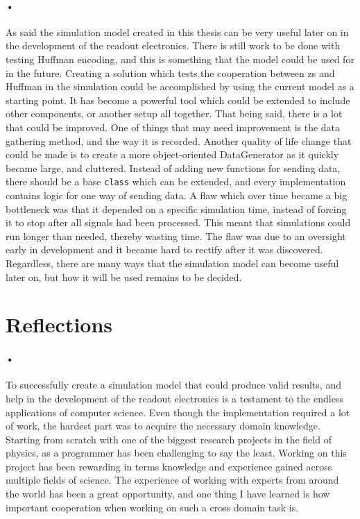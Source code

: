 \documentclass[a4paper, 12pt]{report}
\newcommand{\codeword}[1]{\texttt{#1}}
\begin{document}
\paragraph{•}
As said the simulation model created in this thesis can be very useful later on in the development of the readout electronics.
There is still work to be done with testing Huffman encoding, and this is something that the model could be used for in the future.
Creating a solution which tests the cooperation between \gls{zs} and Huffman in the simulation could be accomplished by using the current model as a starting point.
It has become a powerful tool which could be extended to include other components, or another setup all together.
That being said, there is a lot that could be improved.
One of things that may need improvement is the data gathering method, and the way it is recorded.
Another quality of life change that could be made is to create a more object-oriented DataGenerator as it quickly became large, and cluttered.
Instead of adding new functions for sending data, there should be a base \codeword{class} which can be extended, and every implementation contains logic for one way of sending data.
A flaw which over time became a big bottleneck was that it depended on a specific simulation time, instead of forcing it to stop after all signals had been processed.
This meant that simulations could run longer than needed, thereby wasting time.
The flaw was due to an oversight early in development and it became hard to rectify after it was discovered.
Regardless, there are many ways that the simulation model can become useful later on, but how it will be used remains to be decided.

\section{Reflections}

\paragraph{•}
To successfully create a simulation model that could produce valid results, and help in the development of the readout electronics is a testament to the endless applications of computer science.
Even though the implementation required a lot of work, the hardest part was to acquire the necessary domain knowledge.
Starting from scratch with one of the biggest research projects in the field of physics, as a programmer has been challenging to say the least.
Working on this project has been rewarding in terms knowledge and experience gained across multiple fields of science.
The experience of working with experts from around the world has been a great opportunity, and one thing I have learned is how important cooperation when working on such a cross domain task is.
\end{document}
